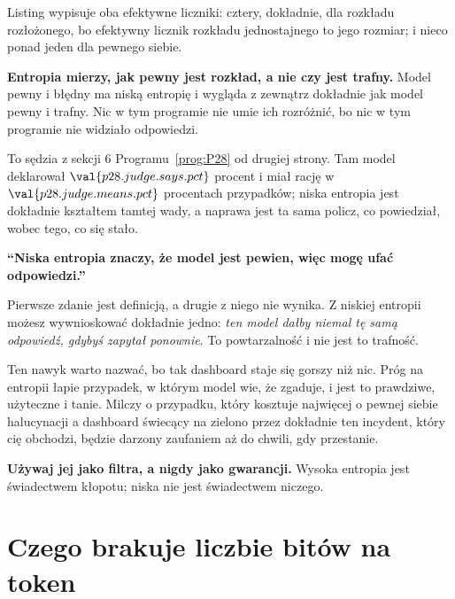 \begin{fr}


Listing wypisuje oba efektywne liczniki: cztery, dokładnie, dla rozkładu
rozłożonego, bo efektywny licznik rozkładu jednostajnego to jego rozmiar; i
nieco ponad jeden dla pewnego siebie.

\textbf{Entropia mierzy, jak pewny jest rozkład, a nie czy jest trafny.} Model
pewny i błędny ma niską entropię i wygląda z zewnątrz dokładnie jak model
pewny i trafny. Nic w tym programie nie umie ich rozróżnić, bo nic w tym
programie nie widziało odpowiedzi.

To sędzia z sekcji 6 Programu~\ref{prog:P28} od drugiej strony. Tam model
deklarował $\val{p28.judge.says.pct}$ procent i miał rację w
$\val{p28.judge.means.pct}$ procentach przypadków; niska entropia jest
dokładnie kształtem tamtej wady, a naprawa jest ta sama \dash{} policz, co
powiedział, wobec tego, co się stało.
\end{fr}

\begin{fr}
\begin{trapbox}
\textbf{\enquote{Niska entropia znaczy, że model jest pewien, więc mogę ufać
odpowiedzi.}}

Pierwsze zdanie jest definicją, a drugie z niego nie wynika. Z niskiej entropii
możesz wywnioskować dokładnie jedno: \emph{ten model dałby niemal tę samą
odpowiedź, gdybyś zapytał ponownie}. To powtarzalność i nie jest to trafność.

Ten nawyk warto nazwać, bo tak dashboard staje się gorszy niż nic. Próg na
entropii łapie przypadek, w którym model wie, że zgaduje, i jest to prawdziwe,
użyteczne i tanie. Milczy o przypadku, który kosztuje najwięcej \dash{} o
pewnej siebie halucynacji \dash{} a dashboard świecący na zielono przez
dokładnie ten incydent, który cię obchodzi, będzie darzony zaufaniem aż do
chwili, gdy przestanie.

\textbf{Używaj jej jako filtra, a nigdy jako gwarancji.} Wysoka entropia jest
świadectwem kłopotu; niska nie jest świadectwem niczego.
\end{trapbox}
\end{fr}

\section{Czego brakuje liczbie bitów na token}
\label{sec:P29-tokeniser}

